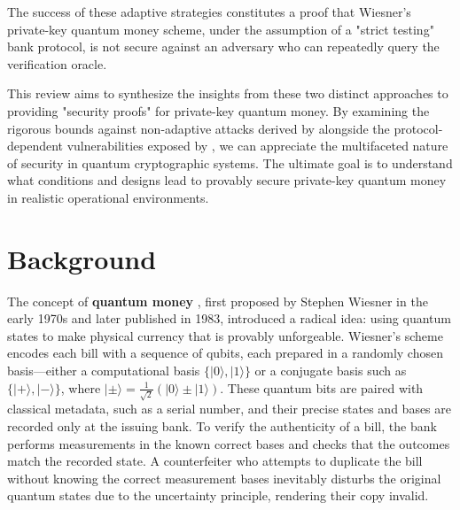 \documentclass{article} %
\begin{document}
\begin{enumerate}
\end{enumerate}
The success of these adaptive strategies constitutes a proof that Wiesner's private-key quantum money scheme, under the assumption of a "strict testing" bank protocol, is not secure against an adversary who can repeatedly query the verification oracle.

This review aims to synthesize the insights from these two distinct approaches to providing "security proofs" for private-key quantum money. By examining the rigorous bounds against non-adaptive attacks derived by \citet{Molina2012Optimal} alongside the protocol-dependent vulnerabilities exposed by \citet{Nagaj2016Adaptive}, we can appreciate the multifaceted nature of security in quantum cryptographic systems. The ultimate goal is to understand what conditions and designs lead to provably secure private-key quantum money in realistic operational environments.

\newpage
\color{black}
\section{Background}

The concept of \textbf{quantum money} \citep{Wiesner1983Conjugate}, first proposed by Stephen Wiesner in the early 1970s and later published in 1983, introduced a radical idea: using quantum states to make physical currency that is provably unforgeable. Wiesner's scheme encodes each bill with a sequence of qubits, each prepared in a randomly chosen basis---either a computational basis $\{|0\rangle, |1\rangle\}$ or a conjugate basis such as $\{|+\rangle, |-\rangle\}$, where $|\pm\rangle = \frac{1}{\sqrt{2}}(|0\rangle \pm |1\rangle)$. These quantum bits are paired with classical metadata, such as a serial number, and their precise states and bases are recorded only at the issuing bank. To verify the authenticity of a bill, the bank performs measurements in the known correct bases and checks that the outcomes match the recorded state. A counterfeiter who attempts to duplicate the bill without knowing the correct measurement bases inevitably disturbs the original quantum states due to the uncertainty principle, rendering their copy invalid. 
\end{document}

